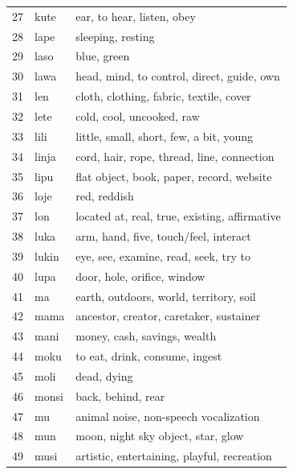 \documentclass[11pt]{article}
\begin{document}
{\begin{multicols}{2}[]
\begin{center}
\begin{tabularx}{\linewidth}{rlX}
27 & kute & ear, to hear, listen, obey\\
28 & lape & sleeping, resting\\
29 & laso & blue, green\\
30 & lawa & head, mind, to control, direct, guide, own\\
31 & len & cloth, clothing, fabric, textile, cover\\
32 & lete & cold, cool, uncooked, raw\\
33 & lili & little, small, short, few, a bit, young\\
34 & linja & cord, hair, rope, thread, line, connection\\
35 & lipu & flat object, book, paper, record, website\\
36 & loje & red, reddish\\
37 & lon & located at, real, true, existing, affirmative\\
38 & luka & arm, hand, five, touch/feel, interact\\
39 & lukin & eye, see, examine, read, seek, try to\\
40 & lupa & door, hole, orifice, window\\
41 & ma & earth, outdoors, world, territory, soil\\
42 & mama & ancestor, creator, caretaker, sustainer\\
43 & mani & money, cash, savings, wealth\\
44 & moku & to eat, drink, consume, ingest\\
45 & moli & dead, dying\\
46 & monsi & back, behind, rear\\
47 & mu & animal noise, non-speech vocalization\\
48 & mun & moon, night sky object, star, glow\\
49 & musi & artistic, entertaining, playful, recreation\\
\end{tabularx}
\end{center}



\end{multicols}}
\end{document}
